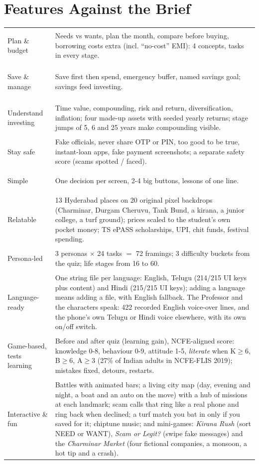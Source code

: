 \documentclass[10pt,a4paper]{article}
\begin{document}
\section{Features Against the Brief}
{\small
\begin{tabularx}{\textwidth}{@{}>{\bfseries\raggedright\arraybackslash}p{3.0cm}X@{}}
\toprule
Plan \& budget & Needs vs wants, plan the month, compare before buying, borrowing costs extra (incl. ``no-cost'' EMI): 4 concepts, tasks in every stage. \\
Save \& manage & Save first then spend, emergency buffer, named savings goal; savings feed investing. \\
Understand investing & Time value, compounding, risk and return, diversification, inflation; four made-up assets with seeded yearly returns; stage jumps of 5, 6 and 25 years make compounding visible. \\
Stay safe & Fake officials, never share OTP or PIN, too good to be true, instant-loan apps, fake payment screenshots; a separate safety score (scams spotted / faced). \\
\midrule
Simple & One decision per screen, 2-4 big buttons, lessons of one line. \\
Relatable & 13 Hyderabad places on 20 original pixel backdrops (Charminar, Durgam Cheruvu, Tank Bund, a kirana, a junior college, a turf ground); prices scaled to the student's own pocket money; TS ePASS scholarships, UPI, chit funds, festival spending. \\
Persona-led & 3 personas $\times$ 24 tasks $=$ 72 framings; 3 difficulty buckets from the quiz; life stages from 16 to 60. \\
Language-ready & One string file per language: English, Telugu (214/215 UI keys plus content) and Hindi (215/215 UI keys); adding a language means adding a file, with English fallback. The Professor and the characters speak: 422 recorded English voice-over lines, and the phone's own Telugu or Hindi voice elsewhere, with its own on/off switch. \\
Game-based, tests learning & Before and after quiz (learning gain), NCFE-aligned score: knowledge 0-8, behaviour 0-9, attitude 1-5, \emph{literate} when K$\geq$6, B$\geq$6, A$\geq$3 (27\% of Indian adults in NCFE-FLIS 2019); mistakes fixed, detours, restarts. \\
Interactive \& fun & Battles with animated bars; a living city map (day, evening and night, a boat and an auto on the move) with a hub of missions at each landmark; scam calls that ring like a real phone and ring back when declined; a turf match you bat in only if you saved for it; chiptune music; and mini-games: \emph{Kirana Rush} (sort NEED or WANT), \emph{Scam or Legit?} (swipe fake messages) and the \emph{Charminar Market} (four fictional companies, a monsoon, a hot tip and a crash). \\

\end{tabularx}}
\end{document}

